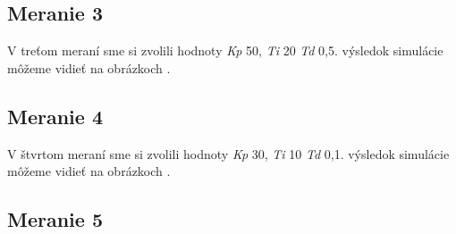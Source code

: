 \documentclass{article}
\begin{document}
\clearpage




\subsection{Meranie 3}
\label{sec:meranie3}

V treťom meraní sme si zvolili hodnoty \textit{Kp} 50, \textit{Ti} 20 \textit{Td} 0,5. výsledok simulácie môžeme vidieť na obrázkoch  .


\clearpage



\subsection{Meranie 4}
\label{sec:meranie4}

V štvrtom meraní sme si zvolili hodnoty \textit{Kp} 30, \textit{Ti} 10 \textit{Td} 0,1. výsledok simulácie môžeme vidieť na obrázkoch  .


\clearpage

\subsection{Meranie 5}
\label{sec:meranie5}
\end{document}
